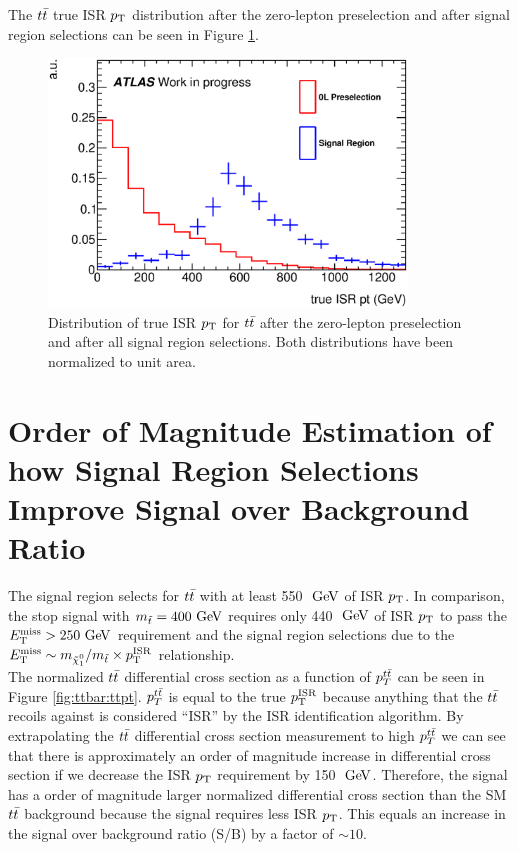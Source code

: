 \indent The $\ttbar$ true ISR $\pt$ distribution after the zero-lepton preselection and after signal region selections can be seen in Figure \ref{fig:ttbar:SR:trueISRpt_presel_SRC}.  \\

\begin{figure}[h!]
  \centering
	\includegraphics[width=0.85\textwidth]{./figures/strategy/Compare0L_truth.eps}
\caption[Distribution of true ISR $\pt$ for $\ttbar$ after the zero-lepton preselection and after all signal region selections]{Distribution of true ISR $\pt$ for $\ttbar$ after the zero-lepton preselection and after all signal region selections.  Both distributions have been normalized to unit area.}
\label{fig:ttbar:SR:trueISRpt_presel_SRC}
\end{figure}

\section{Order of Magnitude Estimation of how Signal Region Selections Improve Signal over Background Ratio}
\label{sec:SR:estimate}

\indent The signal region selects for $\ttbar$ with at least 550 $\gev$ of ISR $\pt$.  In comparison, the stop signal with $m_{\stop} = 400 \gev$ requires only 440 $\gev$ of ISR $\pt$ to pass the $\met > 250 \gev$ requirement and the signal region selections due to the $\met \sim m_{\ninoone}/m_{\stop} \times \PTISR $ relationship.  \\

\indent The normalized $\ttbar$ differential cross section as a function of $p_{T}^{t\bar{t}}$ can be seen in Figure \ref{fig:ttbar:ttpt}.  $p_T^{t\bar{t}}$ is equal to the true $p_{\mathrm{T}}^{\mathrm{ISR}}$ because anything that the $\ttbar$ recoils against is considered ``ISR'' by the ISR identification algorithm.  By extrapolating the $\ttbar$ differential cross section measurement to high $p_T^{t\bar{t}}$ we can see that there is approximately an order of magnitude increase in differential cross section if we decrease the ISR $\pt$ requirement by 150 $\gev$.  Therefore, the signal has a order of magnitude larger normalized differential cross section than the SM $\ttbar$ background because the signal requires less ISR $\pt$.   This equals an increase in the signal over background ratio (S/B) by a factor of $\sim10$. \\

